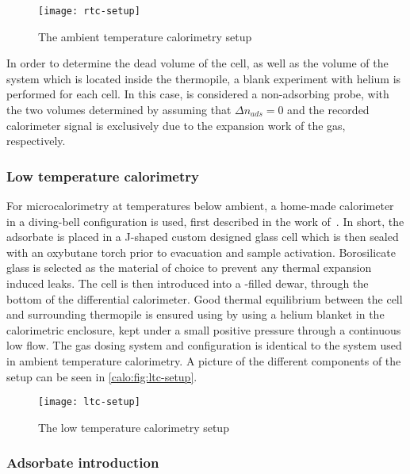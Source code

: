 \begin{figure}[htb]
    \centering
    \texttt{[image: rtc-setup]}%
    \caption{The ambient temperature calorimetry setup}%
    \label{calo:fig:ltc-setup}
\end{figure}

In order to determine the dead volume of the cell, as well 
as the volume of the system which is located inside the thermopile,
a blank experiment with helium is performed for each cell.
In this case,  is considered a non-adsorbing probe, with the 
two volumes determined by assuming that \(\Delta n_{ads} = 0\)
and the recorded calorimeter signal
is exclusively due to the expansion work of the gas, respectively.

\subsubsection{Low temperature calorimetry}\label{calo:ltc}

For microcalorimetry at temperatures below ambient, a home-made calorimeter
in a diving-bell configuration is used, first described in the work 
of~\citet{rouquerolCalorimetricEvidenceBidimensional1977}. In short,
the adsorbate is placed in a J-shaped custom designed glass cell which is
then sealed with an oxybutane torch prior to evacuation and sample 
activation. Borosilicate glass is selected as
the material of choice to prevent any thermal expansion induced leaks.
The cell is then introduced into a -filled dewar, through 
the bottom of the differential calorimeter. Good thermal equilibrium
between the cell and surrounding thermopile is ensured using by 
using a helium blanket in the calorimetric enclosure, kept under a small
positive pressure through a continuous low flow. The gas dosing system
and configuration is identical to the system used in ambient temperature
calorimetry. A picture of the different components of the 
setup can be seen in \autoref{calo:fig:ltc-setup}.

\begin{figure}[htb]
    \centering
    \texttt{[image: ltc-setup]}%
    \caption{The low temperature calorimetry setup}%
    \label{calo:fig:ltc-setup}
\end{figure}

\subsubsection{Adsorbate introduction}\label{calo:ltc}

